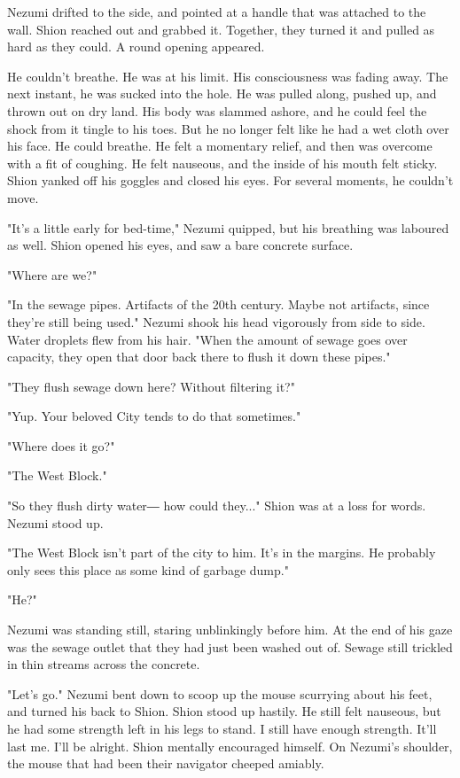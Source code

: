 Nezumi drifted to the side, and pointed at a handle that was attached to
the wall. Shion reached out and grabbed it. Together, they turned it and
pulled as hard as they could. A round opening appeared.

He couldn't breathe. He was at his limit. His consciousness was fading
away. The next instant, he was sucked into the hole. He was pulled
along, pushed up, and thrown out on dry land. His body was slammed
ashore, and he could feel the shock from it tingle to his toes. But he
no longer felt like he had a wet cloth over his face. He could breathe.
He felt a momentary relief, and then was overcome with a fit of
coughing. He felt nauseous, and the inside of his mouth felt sticky.
Shion yanked off his goggles and closed his eyes. For several moments,
he couldn't move.

"It's a little early for bed-time," Nezumi quipped, but his breathing
was laboured as well. Shion opened his eyes, and saw a bare concrete
surface.

"Where are we?"

"In the sewage pipes. Artifacts of the 20th century. Maybe not
artifacts, since they're still being used." Nezumi shook his head
vigorously from side to side. Water droplets flew from his hair. "When
the amount of sewage goes over capacity, they open that door back there
to flush it down these pipes."

"They flush sewage down here? Without filtering it?"

"Yup. Your beloved City tends to do that sometimes."

"Where does it go?"

"The West Block."

"So they flush dirty water― how could they..." Shion was at a loss for
words. Nezumi stood up.

"The West Block isn't part of the city to him. It's in the margins. He
probably only sees this place as some kind of garbage dump."

"He?"

Nezumi was standing still, staring unblinkingly before him. At the end
of his gaze was the sewage outlet that they had just been washed out of.
Sewage still trickled in thin streams across the concrete.

"Let's go." Nezumi bent down to scoop up the mouse scurrying about his
feet, and turned his back to Shion. Shion stood up hastily. He still
felt nauseous, but he had some strength left in his legs to stand. I
still have enough strength. It'll last me. I'll be alright. Shion
mentally encouraged himself. On Nezumi's shoulder, the mouse that had
been their navigator cheeped amiably.

